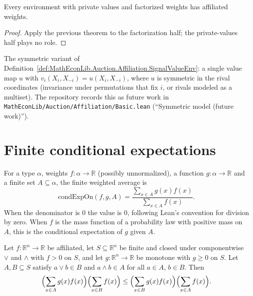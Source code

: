 \begin{theorem}\label{thm:MathEconLib.Auction.Affiliation.IsPrivateValuesWithFactorizedWeights.hasAffiliatedWeights}
\leanok
{}
Every environment with private values and factorized weights has affiliated weights.
\end{theorem}

\begin{proof}
\leanok
{}
Apply the previous theorem to the factorization half; the private-values half plays no role.
\end{proof}

\begin{theorem}\label{thm:open.symmetric_signal_value_model}
The symmetric variant of Definition~\ref{def:MathEconLib.Auction.Affiliation.SignalValueEnv}: a single value map $u$ with $v_i(X_i, X_{-i}) = u(X_i, X_{-i})$, where $u$ is symmetric in the rival coordinates (invariance under permutations that fix $i$, or rivals modeled as a multiset). The repository records this as future work in \texttt{MathEconLib/Auction/Affiliation/Basic.lean} (``Symmetric model (future work)'').
\end{theorem}

\section{Finite conditional expectations}

\begin{definition}\label{def:MathEconLib.Auction.Affiliation.condExpOn}
\leanok
For a type $\alpha$, weights $f : \alpha \to \mathbb{R}$ (possibly unnormalized), a function $g : \alpha \to \mathbb{R}$ and a finite set $A \subseteq \alpha$, the finite weighted average is
\[
  \mathrm{condExpOn}(f, g, A) = \frac{\sum_{x \in A} g(x) f(x)}{\sum_{x \in A} f(x)}.
\]
When the denominator is $0$ the value is $0$, following Lean's convention for division by zero. When $f$ is the mass function of a probability law with positive mass on $A$, this is the conditional expectation of $g$ given $A$.
\end{definition}

\begin{lemma}\label{thm:MathEconLib.Auction.Affiliation.sum_mul_sum_le_of_affiliated}
\leanok
{}
Let $f : \mathbb{R}^n \to \mathbb{R}$ be affiliated, let $S \subseteq \mathbb{R}^n$ be finite and closed under componentwise $\vee$ and $\wedge$ with $f > 0$ on $S$, and let $g : \mathbb{R}^n \to \mathbb{R}$ be monotone with $g \ge 0$ on $S$. Let $A, B \subseteq S$ satisfy $a \vee b \in B$ and $a \wedge b \in A$ for all $a \in A$, $b \in B$. Then
\[
  \Bigl(\sum_{x \in A} g(x) f(x)\Bigr)\Bigl(\sum_{x \in B} f(x)\Bigr) \le \Bigl(\sum_{x \in B} g(x) f(x)\Bigr)\Bigl(\sum_{x \in A} f(x)\Bigr).
\]
\end{lemma}

